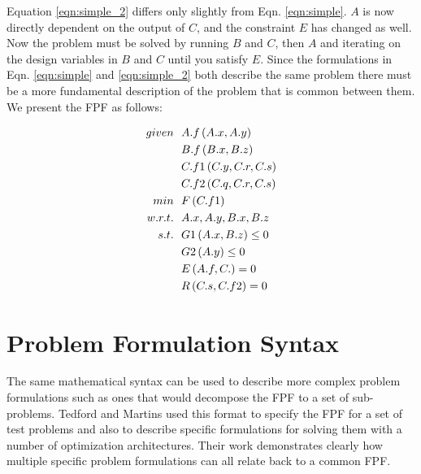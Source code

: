 \documentclass[]{aiaa-tc} %
\begin{document}
    Equation \ref{eqn:simple_2} differs only slightly from Eqn. \ref{eqn:simple}. $A$ is now directly dependent on the output of $C$, 
    and the constraint $E$ has changed as well. Now the problem must be solved by running $B$ and $C$, then $A$ and iterating 
    on the design variables in $B$ and $C$ until you satisfy $E$. Since the formulations in Eqn. \ref{eqn:simple} 
    and \ref{eqn:simple_2} both describe the same problem there must be a more fundamental description of the problem that is common
    between them. We present the FPF as follows: 

    \begin{align}
        given & \ \ A.f\left(A.x,A.y\right) \notag
        \\ & \ \  B.f\left(B.x,B.z\right) \notag
        \\ & \ \  C.f1\left(C.y,C.r,C.s\right) \notag
        \\ & \ \  C.f2\left(C.q,C.r,C.s\right) \notag
        \\min &\ \ F\left(C.f1\right) \notag
        \\ w.r.t. &\ \  A.x,A.y,B.x,B.z \notag
        \\ s.t. &\ \ G1\left(A.x,B.z\right) \leq 0 \notag
        \\      &\ \ G2\left(A.y\right) \leq 0 \notag
        \\      &\ \ E\left(A.f,C.\right) = 0 \notag
        \\      &\ \ R\left(C.s,C.f2\right) = 0 
        \label{eqn:simple_2}
    \end{align}

    \section{Problem Formulation Syntax}

    The same mathematical syntax can be used to describe more complex problem formulations
    such as ones that would decompose the FPF to a set of sub-problems. Tedford and Martins used this format to specify the 
    FPF for a set of test problems and also to describe specific formulations for solving them with a 
    number of optimization architectures\cite{Tedford2009}. Their work demonstrates clearly how multiple specific 
    problem formulations can all relate back to a common FPF. 
\end{document}
